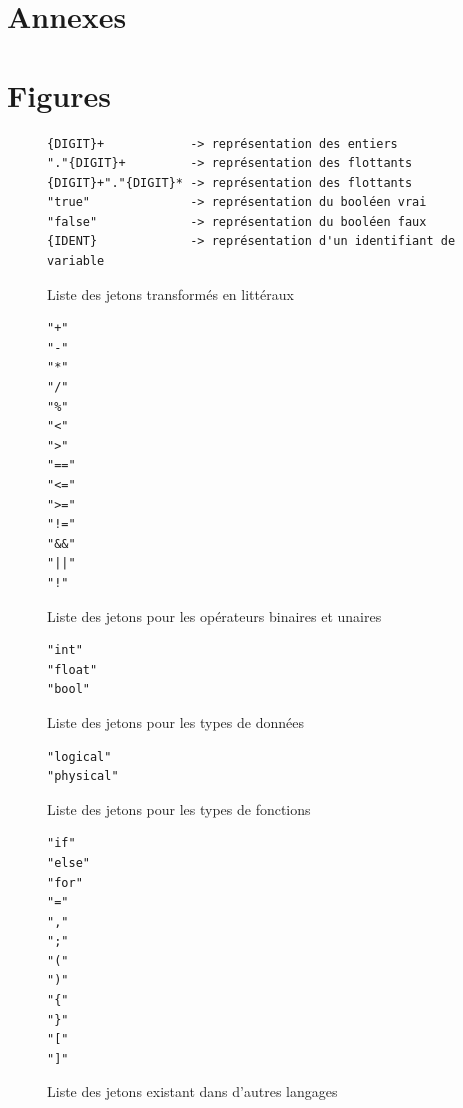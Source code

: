 \documentclass[a4paper, 11pt]{article}
\begin{document}
\clearpage
\begin{appendix}
\section*{Annexes}
\section{Figures}
\label{sec:figures}

\begin{figure}[htbp]
    \centering
    \begin{lstlisting}
{DIGIT}+            -> représentation des entiers
"."{DIGIT}+         -> représentation des flottants
{DIGIT}+"."{DIGIT}* -> représentation des flottants
"true"              -> représentation du booléen vrai
"false"             -> représentation du booléen faux
{IDENT}             -> représentation d'un identifiant de variable
    \end{lstlisting}
    \caption{Liste des jetons transformés en littéraux}
    \label{fig:jetons_literal}
\end{figure}

\begin{figure}[htbp]
    \centering
    \begin{lstlisting}
"+"
"-"
"*"
"/"
"%"
"<"
">"
"=="
"<="
">="
"!="
"&&"
"||"
"!"
    \end{lstlisting}
    \caption{Liste des jetons pour les opérateurs binaires et unaires}
    \label{fig:jetons_binaires_unaires}
\end{figure}

\begin{figure}[htbp]
    \centering
    \begin{lstlisting}
"int"
"float"
"bool"
    \end{lstlisting}
    \caption{Liste des jetons pour les types de données}
    \label{fig:jetons_type_donnees}
\end{figure}

\begin{figure}[htbp]
    \centering
    \begin{lstlisting}
"logical"
"physical"
    \end{lstlisting}
    \caption{Liste des jetons pour les types de fonctions}
    \label{fig:jetons_type_func}
\end{figure}

\begin{figure}
    \centering
    \begin{lstlisting}
"if"
"else"
"for"
"="
"," 
";"
"("
")"
"{"
"}"
"["
"]"
    \end{lstlisting}
    \caption{Liste des jetons existant dans d'autres langages}
    \label{fig:jetons_C}
\end{figure}



\end{appendix}
\end{document}
